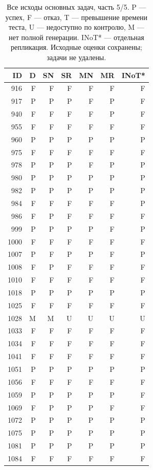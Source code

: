\begin{table}[!htbp]\centering\footnotesize
\caption{Все исходы основных задач, часть 5/5. P --- успех, F --- отказ, T --- превышение времени теста, U --- недоступно по контролю, M --- нет полной генерации. INoT* --- отдельная репликация. Исходные оценки сохранены; задачи не удалены.}
\begin{tabular*}{\textwidth}{@{\extracolsep{\fill}}rrrrrrr}\toprule
ID & D & SN & SR & MN & MR & INoT*\\\midrule
916 & F & F & F & F & F & F\\
917 & P & P & P & F & P & F\\
940 & F & F & F & F & P & F\\
955 & F & F & F & F & F & F\\
960 & P & P & P & P & P & P\\
975 & F & F & F & F & F & F\\
978 & P & P & P & F & P & P\\
980 & P & P & P & P & P & P\\
982 & P & P & P & P & P & P\\
984 & F & F & F & F & F & P\\
986 & F & P & F & F & F & F\\
999 & P & P & P & P & F & P\\
1000 & F & F & F & F & F & F\\
1007 & P & F & P & P & F & P\\
1008 & F & P & F & F & F & F\\
1010 & F & F & F & F & F & F\\
1018 & P & P & P & P & P & P\\
1025 & F & F & F & F & F & F\\
1028 & M & M & U & U & U & U\\
1033 & F & F & F & F & F & F\\
1034 & F & F & F & F & F & F\\
1041 & F & F & F & F & F & F\\
1051 & P & P & P & P & P & P\\
1056 & F & F & F & F & F & F\\
1059 & P & P & P & P & P & F\\
1069 & F & P & P & P & F & F\\
1072 & P & P & P & P & P & P\\
1075 & P & P & P & P & P & P\\
1081 & P & P & P & P & P & P\\
1084 & F & F & F & F & F & F\\

\end{tabular*}
\end{table}

